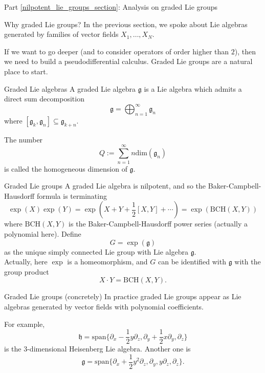 \documentclass{beamer}
\numberwithin{equation}{section}
\theoremstyle{plain}
\theoremstyle{plain}
\theoremstyle{definition}
\theoremstyle{plain}
\theoremstyle{plain}
\theoremstyle{definition}
\newcommand{\gf}{\mathfrak{g}}
\begin{document}
\begin{frame}
    \Huge{Part \ref{nilpotent_lie_groups_section}: Analysis on graded Lie groups}
\end{frame}

\begin{frame}{Why graded Lie groups?}
    In the previous section, we spoke about Lie algebras generated by families of vector fields $X_1,\ldots,X_N.$

    If we want to go deeper (and to consider operators of order higher than $2$), then we need to build a pseudodifferential calculus. Graded Lie groups are a natural place to start.
\end{frame}

\begin{frame}{Graded Lie algebras}
  A graded Lie algebra $\gf$ is a Lie algebra which admits a direct sum decomposition
  \[
    \gf = \bigoplus_{n=1}^\infty \gf_n
  \]
  where $[\gf_k,\gf_n] \subseteq \gf_{k+n}.$

  The number
  \[
    Q := \sum_{n=1}^\infty n\mathrm{dim}(\gf_n)
  \]
  is called the homogeneous dimension of $\gf.$
\end{frame}

\begin{frame}{Graded Lie groups}
    A graded Lie algebra is nilpotent, and so the Baker-Campbell-Hausdorff formula is terminating
    \[
        \exp(X)\exp(Y) = \exp(X+Y+\frac12[X,Y]+\cdots)=  \exp(\mathrm{BCH}(X,Y))
    \]
    where $\mathrm{BCH}(X,Y)$ is the Baker-Campbell-Hausdorff power series (actually a polynomial here).
    \pause
    Define
    \[
        G = \exp(\gf)
    \]
    as the unique simply connected Lie group with Lie algebra $\gf.$ \\\pause
    Actually, here $\exp$ is a homeomorphism, and $G$ can be identified with $\gf$ with the group product
    \[
        X\cdot Y = \mathrm{BCH}(X,Y).
    \]
\end{frame}

\begin{frame}{Graded Lie groups (concretely)}
  In practice graded Lie groups appear as Lie algebras generated by vector fields with polynomial coefficients.

  For example,
  \[
    \mathfrak{h} = \mathrm{span}\{\partial_x-\frac12y\partial_z,\partial_y+\frac12x\partial_y,\partial_z\}
  \]
  is the $3$-dimensional Heisenberg Lie algebra. Another one is
  \[
    \mathfrak{g} = \mathrm{span}\{\partial_x+\frac12y^2\partial_z,\partial_y,y\partial_z,\partial_z\}.
  \]
\end{frame}
\end{document}
